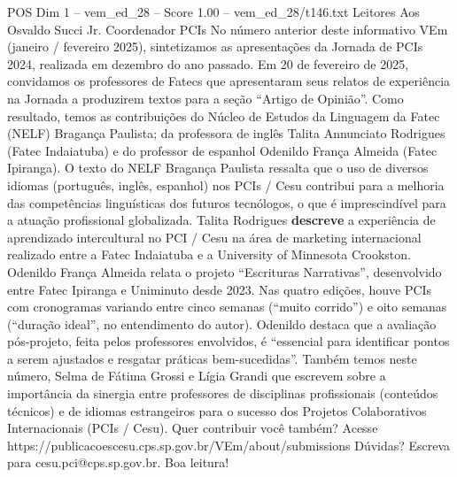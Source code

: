\begin{textsample}{POS Dim 1 – vem\_ed\_28 – Score 1.00 – vem\_ed\_28/t146.txt}  \label{ex:f1_pos_052}
Leitores Aos Osvaldo Succi Jr.
Coordenador PCIs No número anterior deste informativo VEm (janeiro / fevereiro 2025), sintetizamos as apresentações da Jornada de PCIs 2024, realizada em dezembro do ano passado.
Em 20 de fevereiro de 2025, convidamos os professores de Fatecs que apresentaram seus relatos de experiência na Jornada a produzirem textos para a seção “Artigo de Opinião”.
Como resultado, temos as contribuições do Núcleo de Estudos da Linguagem da Fatec (NELF) Bragança Paulista; da professora de inglês Talita Annunciato Rodrigues (Fatec Indaiatuba) e do professor de espanhol Odenildo França Almeida (Fatec Ipiranga).
O texto do NELF Bragança Paulista ressalta que o uso de diversos idiomas (português, inglês, espanhol) nos PCIs / Cesu contribui para a melhoria das competências linguísticas dos futuros tecnólogos, o que é imprescindível para a atuação profissional globalizada.
Talita Rodrigues \textbf{descreve} a experiência de aprendizado intercultural no PCI / Cesu na área de marketing internacional realizado entre a Fatec Indaiatuba e a University of Minnesota Crookston.
Odenildo França Almeida relata o projeto “Escrituras Narrativas”, desenvolvido entre Fatec Ipiranga e Uniminuto desde 2023.
Nas quatro edições, houve PCIs com cronogramas variando entre cinco semanas (“muito corrido”) e oito semanas (“duração ideal”, no entendimento do autor).
Odenildo destaca que a avaliação pós-projeto, feita pelos professores envolvidos, é “essencial para identificar pontos a serem ajustados e resgatar práticas bem-sucedidas”.
Também temos neste número, Selma de Fátima Grossi e Lígia Grandi que escrevem sobre a importância da sinergia entre professores de disciplinas profissionais (conteúdos técnicos) e de idiomas estrangeiros para o sucesso dos Projetos Colaborativos Internacionais (PCIs / Cesu).
Quer contribuir você também?
Acesse https://publicacoescesu.cps.sp.gov.br/VEm/about/submissions Dúvidas?
Escreva para cesu.pci@cps.sp.gov.br.
Boa leitura!

\end{textsample}
